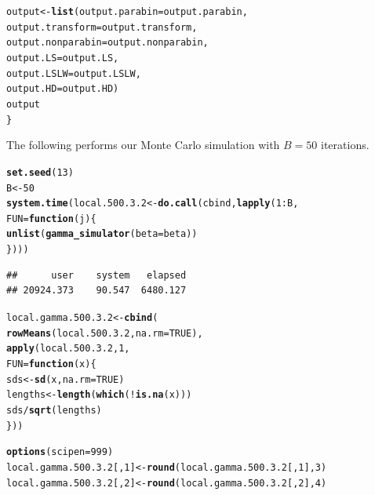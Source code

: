 \documentclass[11pt]{article}\usepackage[]{graphicx}\usepackage[]{color}
\makeatletter
\newcommand{\hlnum}[1]{\textcolor[rgb]{0.686,0.059,0.569}{#1}}%
\newcommand{\hlopt}[1]{\textcolor[rgb]{0,0,0}{#1}}%
\newcommand{\hlstd}[1]{\textcolor[rgb]{0.345,0.345,0.345}{#1}}%
\newcommand{\hlkwa}[1]{\textcolor[rgb]{0.161,0.373,0.58}{\textbf{#1}}}%
\newcommand{\hlkwb}[1]{\textcolor[rgb]{0.69,0.353,0.396}{#1}}%
\newcommand{\hlkwc}[1]{\textcolor[rgb]{0.333,0.667,0.333}{#1}}%
\newcommand{\hlkwd}[1]{\textcolor[rgb]{0.737,0.353,0.396}{\textbf{#1}}}%
\newenvironment{kframe}{%
 \def\at@end@of@kframe{}%
 \ifinner\ifhmode%
  \def\at@end@of@kframe{\end{minipage}}%
  \begin{minipage}{\columnwidth}%
 \fi\fi%
 \def\FrameCommand##1{\hskip\@totalleftmargin \hskip-\fboxsep
 \colorbox{shadecolor}{##1}\hskip-\fboxsep
     \hskip-\linewidth \hskip-\@totalleftmargin \hskip\columnwidth}%
 \MakeFramed {\advance\hsize-\width
   \@totalleftmargin\z@ \linewidth\hsize
   \@setminipage}}%
 {\par\unskip\endMakeFramed%
 \at@end@of@kframe}
\newenvironment{knitrout}{}{} %
\makeatother
\begin{document}
\begin{knitrout}
\begin{kframe}
\begin{alltt}
  \hlstd{output} \hlkwb{<-} \hlkwd{list}\hlstd{(}\hlkwc{output.parabin} \hlstd{= output.parabin,}
    \hlkwc{output.transform} \hlstd{= output.transform,}
    \hlkwc{output.nonparabin} \hlstd{= output.nonparabin,}
    \hlkwc{output.LS} \hlstd{= output.LS,}
    \hlkwc{output.LSLW} \hlstd{= output.LSLW,}
    \hlkwc{output.HD} \hlstd{= output.HD)}
  \hlstd{output}
\hlstd{\}}
\end{alltt}
\end{kframe}
\end{knitrout}

The following performs our Monte Carlo simulation with $B = 50$ iterations. 

\begin{knitrout}
\color{fgcolor}\begin{kframe}
\begin{alltt}
\hlkwd{set.seed}\hlstd{(}\hlnum{13}\hlstd{)}
\hlstd{B} \hlkwb{<-} \hlnum{50}
\hlkwd{system.time}\hlstd{(local.500.3.2} \hlkwb{<-} \hlkwd{do.call}\hlstd{(cbind,} \hlkwd{lapply}\hlstd{(}\hlnum{1}\hlopt{:}\hlstd{B,}
  \hlkwc{FUN} \hlstd{=} \hlkwa{function}\hlstd{(}\hlkwc{j}\hlstd{)\{}
    \hlkwd{unlist}\hlstd{(}\hlkwd{gamma_simulator}\hlstd{(}\hlkwc{beta} \hlstd{= beta))}
\hlstd{\})))}
\end{alltt}
\begin{verbatim}
##      user    system   elapsed 
## 20924.373    90.547  6480.127
\end{verbatim}
\end{kframe}
\end{knitrout}

\begin{knitrout}
\color{fgcolor}\begin{kframe}
\begin{alltt}
\hlstd{local.gamma.500.3.2} \hlkwb{<-} \hlkwd{cbind}\hlstd{(}
  \hlkwd{rowMeans}\hlstd{(local.500.3.2,} \hlkwc{na.rm} \hlstd{=} \hlnum{TRUE}\hlstd{),}
  \hlkwd{apply}\hlstd{(local.500.3.2,} \hlnum{1}\hlstd{,}
  \hlkwc{FUN} \hlstd{=} \hlkwa{function}\hlstd{(}\hlkwc{x}\hlstd{)\{}
    \hlstd{sds} \hlkwb{<-} \hlkwd{sd}\hlstd{(x,} \hlkwc{na.rm} \hlstd{=} \hlnum{TRUE}\hlstd{)}
    \hlstd{lengths} \hlkwb{<-} \hlkwd{length}\hlstd{(}\hlkwd{which}\hlstd{(}\hlopt{!}\hlkwd{is.na}\hlstd{(x)))}
    \hlstd{sds} \hlopt{/} \hlkwd{sqrt}\hlstd{(lengths)}
  \hlstd{\}))}

\hlkwd{options}\hlstd{(}\hlkwc{scipen} \hlstd{=} \hlnum{999}\hlstd{)}
\hlstd{local.gamma.500.3.2[,} \hlnum{1}\hlstd{]} \hlkwb{<-} \hlkwd{round}\hlstd{(local.gamma.500.3.2[,} \hlnum{1}\hlstd{],} \hlnum{3}\hlstd{)}
\hlstd{local.gamma.500.3.2[,} \hlnum{2}\hlstd{]} \hlkwb{<-} \hlkwd{round}\hlstd{(local.gamma.500.3.2[,} \hlnum{2}\hlstd{],} \hlnum{4}\hlstd{)}
\end{alltt}
\end{kframe}
\end{knitrout}
\end{document}

